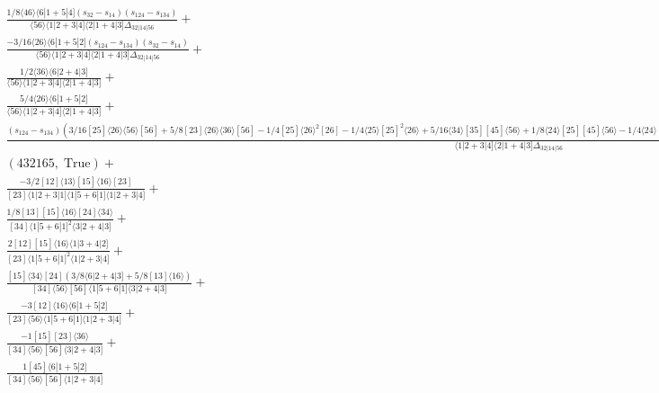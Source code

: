 \documentclass[varwidth, border=5pt]{standalone}
\begin{document}
\begin{my}
$\begin{gathered}
\scriptscriptstyle\frac{1/8⟨46⟩⟨6|1+5|4](s_{32}-s_{14})(s_{124}-s_{134})}{⟨56⟩⟨1|2+3|4]⟨2|1+4|3]Δ_{32|14|56}}+\\
\scriptscriptstyle\frac{-3/16⟨26⟩⟨6|1+5|2](s_{124}-s_{134})(s_{32}-s_{14})}{⟨56⟩⟨1|2+3|4]⟨2|1+4|3]Δ_{32|14|56}}+\\
\scriptscriptstyle\frac{1/2⟨36⟩⟨6|2+4|3]}{⟨56⟩⟨1|2+3|4]⟨2|1+4|3]}+\\
\scriptscriptstyle\frac{5/4⟨26⟩⟨6|1+5|2]}{⟨56⟩⟨1|2+3|4]⟨2|1+4|3]}+\\
\scriptscriptstyle\frac{(s_{124}-s_{134})(3/16[25]⟨26⟩⟨56⟩[56]+5/8[23]⟨26⟩⟨36⟩[56]-1/4[25]⟨26⟩^2[26]-1/4⟨25⟩[25]^2⟨26⟩+5/16⟨34⟩[35][45]⟨56⟩+1/8⟨24⟩[25][45]⟨56⟩-1/4⟨24⟩[24][25]⟨26⟩+1/4⟨34⟩[34][35]⟨36⟩-1/4⟨23⟩[25][34]⟨46⟩-5/8[23]⟨26⟩⟨34⟩[45])}{⟨1|2+3|4]⟨2|1+4|3]Δ_{32|14|56}}+\\
\scriptscriptstyle(432165,\;\text{True})+\\
\scriptscriptstyle\frac{-3/2[12]⟨13⟩[15]⟨16⟩[23]}{[23]⟨1|2+3|1]⟨1|5+6|1]⟨1|2+3|4]}+\\
\scriptscriptstyle\frac{1/8[13][15]⟨16⟩[24]⟨34⟩}{[34]⟨1|5+6|1]^2⟨3|2+4|3]}+\\
\scriptscriptstyle\frac{2[12][15]⟨16⟩⟨1|3+4|2]}{[23]⟨1|5+6|1]^2⟨1|2+3|4]}+\\
\scriptscriptstyle\frac{[15]⟨34⟩[24](3/8⟨6|2+4|3]+5/8[13]⟨16⟩)}{[34]⟨56⟩[56]⟨1|5+6|1]⟨3|2+4|3]}+\\
\scriptscriptstyle\frac{-3[12]⟨16⟩⟨6|1+5|2]}{[23]⟨56⟩⟨1|5+6|1]⟨1|2+3|4]}+\\
\scriptscriptstyle\frac{-1[15][23]⟨36⟩}{[34]⟨56⟩[56]⟨3|2+4|3]}+\\
\scriptscriptstyle\frac{1[45]⟨6|1+5|2]}{[34]⟨56⟩[56]⟨1|2+3|4]}\phantom{+}
\end{gathered}$
\end{my}
\end{document}
